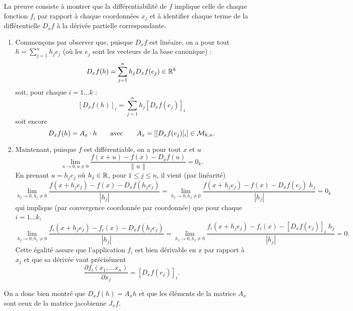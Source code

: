 \proof
La preuve consiste à montrer que la différentiabilité de $f$ implique celle de chaque fonction $f_i$ par rapport à chaque coordonnées $x_j$ et à identifier chaque terme de la différentielle $D_xf$ à la dérivée partielle correspondante. 
\begin{enumerate}
  \item Commençons par observer que, puisque $D_x f$ est linéaire, on a pour tout $h = \sum_{j=1}^n h_j e_j$ (où les $e_j$ sont les vecteurs de la base canonique) :
  $$
  D_xf(h) = \sum_{j=1}^n h_j D_xf(e_j) \in \mathbb{R}^k
  $$
  soit, pour chaque $i = 1 \dots k$ :
  $$
  [D_xf(h)]_i = \sum_{j=1}^n h_j [D_xf(e_j)]_i
  $$
  soit encore
  $$
  D_xf(h) = A_x \cdot h
  \qquad \text{avec} \qquad
  A_x = \left[ [D_xf(e_j)]_i \right] \in \mathcal{M}_{k, n}.
  $$
  \item Maintenant, puisque $f$ est différentiable, on a pour tout $x$ et $u$
  $$
  \lim_{u\to 0, u \neq 0} \frac{f(x+u) - f(x) - D_xf(u)}{\|u\|} = 0_k.
  $$
  En prenant $u = h_j e_j$ où $h_j \in \mathbb{R}$, pour $1 \leq j \leq n$, il vient (par linéarité)
  $$
  \lim_{h_j\to 0, h_j \neq 0} \frac{f(x+h_j e_j) - f(x) - D_xf(h_j e_j)}{|h_j|} 
  = \lim_{h_j\to 0, h_j \neq 0} \frac{f(x+h_j e_j) - f(x) - D_xf(e_j) \; h_j}{|h_j|} 
  =  0_k
  $$
  qui implique (par convergence coordonnée par coordonnée) que pour chaque $i = 1 \dots k$, 
  $$
  \lim_{h_j\to 0, h_j \neq 0} \frac{f_i(x+h_j e_j) - f_i(x) - D_xf(h_j e_j)}{|h_j|} 
  =   
  \lim_{h_j\to 0, h_j \neq 0} \frac{f_i(x+h_j e_j) - f_i(x) - [D_xf(e_j)]_i \; h_j}{|h_j|} 
  = 0.
  $$
  Cette égalité assure que l'application $f_i$ est bien dérivable en $x$ par rapport à $x_j$ et que sa dérivée vaut précisément
  $$
  \frac{\partial f_i(x_1, \dots x_n)}{\partial x_j} = [D_xf(e_j)]_i.
  $$
\end{enumerate}
On a donc bien montré que $D_xf(h) = A_x h$ et que les éléments de la matrice $A_x$ sont ceux de la matrice jacobienne $J_xf$.
\eproof


